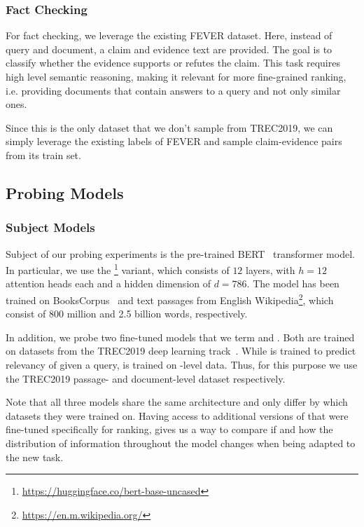 \subsubsection{Fact Checking}
For fact checking, we leverage the existing FEVER \cite{thorne-etal-2018-fever} dataset. Here, instead of query and document, a claim and evidence text are provided. The goal is to classify whether the evidence supports or refutes the claim. This task requires high level semantic reasoning, making it relevant for more fine-grained ranking, i.e. providing documents that contain  answers to a query and not only similar ones.

Since this is the only dataset that we don't sample from TREC2019, we can simply leverage the existing labels of FEVER and sample claim-evidence pairs from its train set.

\subsection{Probing Models}
\subsubsection{Subject Models}
\label{sec:subjects}
Subject of our probing experiments is the pre-trained BERT~\cite{devlin-etal-2019-bert} transformer model. In particular, we use the \footnote{\url{https://huggingface.co/bert-base-uncased}} variant, which consists of $12$ layers, with $h=12$ attention heads each and a hidden dimension of $d=786$. The model has been trained on BooksCorpus~\cite{7410368} and text passages from English Wikipedia\footnote{\url{https://en.m.wikipedia.org/}}, which consist of 800 million and 2.5 billion words, respectively.

In addition, we probe two fine-tuned  models that we term  and . Both are trained on datasets from the TREC2019 deep learning track~\cite{DBLP:journals/corr/abs-2003-07820}. While  is trained to predict relevancy of  given a query,  is trained on -level data. Thus, for this purpose we use the TREC2019 passage- and document-level dataset respectively.

Note that all three models share the same architecture and only differ by which datasets they were trained on. Having access to additional versions of  that were fine-tuned specifically for ranking, gives us a way to compare if and how the distribution of information throughout the model changes when being adapted to the new task.

